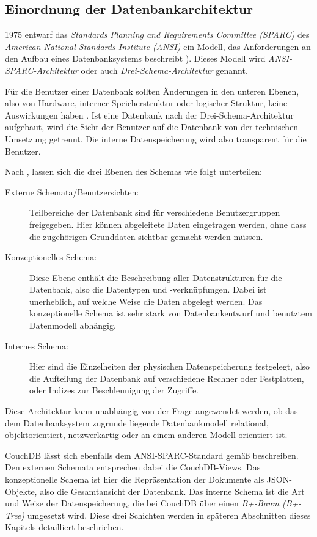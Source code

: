 \subsection{Einordnung der Datenbankarchitektur}
\label{subsec:3schema}

1975 entwarf das \textit{Standards Planning and Requirements Committee (SPARC)} des \textit{American National Standards Institute (ANSI)} ein Modell, das Anforderungen an den Aufbau eines Datenbanksystems beschreibt ). Dieses Modell wird \textit{ANSI-SPARC-Architektur} oder auch \textit{Drei-Schema-Architektur} genannt. 

Für die Benutzer einer Datenbank sollten Änderungen in den unteren Ebenen, also von Hardware, interner Speicherstruktur oder logischer Struktur, keine Auswirkungen haben . Ist eine Datenbank nach der Drei-Schema-Architektur aufgebaut, wird die Sicht der Benutzer auf die Datenbank von der technischen Umsetzung getrennt. Die interne Datenspeicherung wird also transparent für die Benutzer.

Nach , lassen sich die drei Ebenen des Schemas wie folgt unterteilen:

\begin{description}
  \item[Externe Schemata/Benutzersichten:] Teilbereiche der Datenbank sind für verschiedene Benutzergruppen freigegeben. Hier können abgeleitete Daten eingetragen werden, ohne dass die zugehörigen Grunddaten sichtbar gemacht werden müssen.
  \item[Konzeptionelles Schema:] Diese Ebene enthält die Beschreibung aller Datenstrukturen für die Datenbank, also die Datentypen und -verknüpfungen. Dabei ist unerheblich, auf welche Weise die Daten abgelegt werden. Das konzeptionelle Schema ist sehr stark von Datenbankentwurf und benutztem Datenmodell abhängig.
  \item[Internes Schema:] Hier sind die Einzelheiten der physischen Datenspeicherung festgelegt, also die Aufteilung der Datenbank auf verschiedene Rechner oder Festplatten, oder Indizes zur Beschleunigung der Zugriffe.
\end{description}

Diese Architektur kann unabhängig von der Frage angewendet werden, ob das dem Datenbanksystem zugrunde liegende Datenbankmodell relational, objektorientiert, netzwerkartig oder an einem anderen Modell orientiert ist. 

CouchDB lässt sich ebenfalls dem ANSI-SPARC-Standard gemäß beschreiben. Den externen Schemata entsprechen dabei die CouchDB-Views. Das konzeptionelle Schema ist hier die Repräsentation der Dokumente als JSON-Objekte, also die Gesamtansicht der Datenbank. Das interne Schema ist die Art und Weise der Datenspeicherung, die bei CouchDB über einen  \textit{B+-Baum (B+-Tree)} umgesetzt wird. Diese drei Schichten werden in späteren Abschnitten dieses Kapitels detailliert beschrieben.




